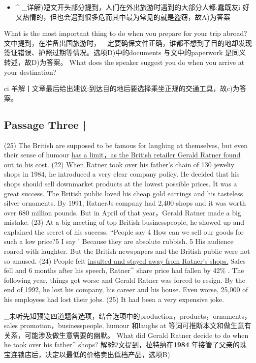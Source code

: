 \documentclass[UTF8,11pt]{ctexart}
\begin{document}
\begin{itemize}[leftmargin=2em,itemsep=.2em,topsep=.4em]\item[A.] \textasciicircum{} \_详解)短文开头部分提到，人们在外出旅游时遇到的大部分人都:蠢既友i 好又热情的，但也会遇到很多危而其中最为常见的就是盗窃，故A)为答案
\end{itemize}

What is the most important thing to do when you prepare for your trip abroad? 文中提到，在准备出国旅游时，—定要确保文件正确，谁都不想到了目的地却发现签证错误、护照过期等情况。选项D)中的documents 与文中的paperwork 是同义转述，故D)为答案。 What does the speaker suggest you do when you arrive at your destination?


ci 羊解丨文章最后给出建议:到达目的地后要选择乘坐正规的交通工具，故c)为答案。


\subsection*{Passage Three |}


(25) The British are supposed to be famous for laughing at themselves, but even their sense of humour \uline{has a limit，as the British retailer Gerald Ratner found out to his cost.} (22) \uline{When Ratner took over hi}s \uline{father’s }chain of 130 jeweliy shops in 1984, he introduced a very clear company policy. He decided that his shops should sell downmarket products at the lowest possible prices. It was a great success. The British public loved his cheap gold earrings and his tasteless silver ornaments. By 1991, RatnerJs company had 2,400 shops and it was worth over 680 million pounds. But in April of that year，Gerald Ratner made a big mistake. (23) At a big meeting of top British businesspeople, he showed up and explained the secret of his success. “People say 4 How can we sell our goods for such a low price?5 I say ' Because they are absolute rubbish. 5 His audience roared with laughter. But the British newspapers and the British public were not so amused. (24) People felt \uline{insulted and stayed away from Ratner’s shops.} Sales fell and 6 months after his speech, Ratner\textasciicircum{} share price had fallen by 42\% . The following year, things got worse and Gerald Ratner was forced to resign. By the end of 1992, he lost his company, his career and his house. Even worse, 25,000 of his employees had lost their jobs. (25) It had been a very expensive joke.


\_未听先知预览四道题各选项，结合选项中的production，products，ornaments，sales promotion，businesspeople, humour 和laughs at 等词可推断本文和做生意有关系，可能涉及做生意需要的幽默。 What did Gerald Ratner decide to do when he took over his father\textasciicircum{} shops? 解\textbf{\$}短文提到，拉特纳在\textbf{1984} 年接管了父亲的珠宝连锁店后，决定以最低的价格卖出低档产品，选项B)
\end{document}
